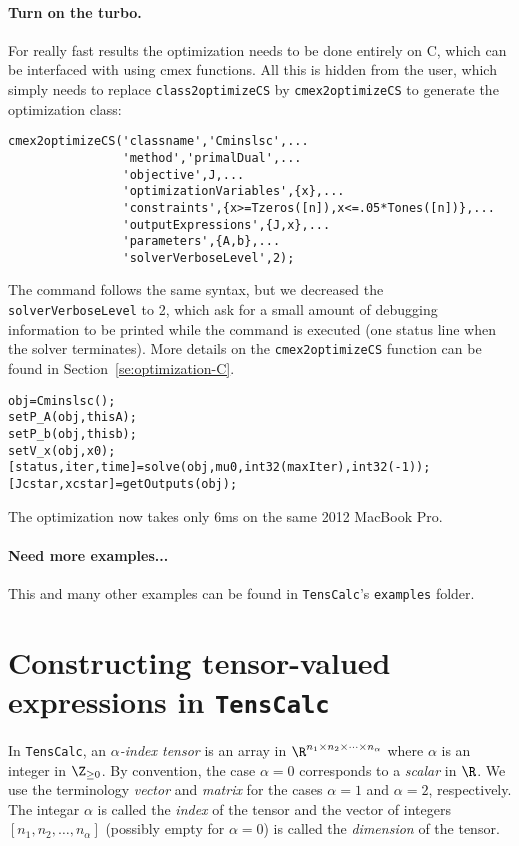 \documentclass[11pt]{article}
\newcommand{\TC}{\texttt{TensCalc}}
\theoremstyle{remark}
\begin{document}
\paragraph{Turn on the turbo.} For really fast results the
optimization needs to be done entirely on C, which can be interfaced
with \matlab{} using cmex functions. All this is hidden from the user,
which simply needs to replace \lstinline{class2optimizeCS} by
\lstinline{cmex2optimizeCS} to generate the optimization class:
\begin{lstlisting}
cmex2optimizeCS('classname','Cminslsc',...
                'method','primalDual',...
                'objective',J,...
                'optimizationVariables',{x},...
                'constraints',{x>=Tzeros([n]),x<=.05*Tones([n])},...
                'outputExpressions',{J,x},...
                'parameters',{A,b},...
                'solverVerboseLevel',2);
\end{lstlisting}
The command follows the same syntax, but we decreased the
\lstinline{solverVerboseLevel} to 2, which ask for a small amount of
debugging information to be printed while the command is executed (one
status line when the solver terminates).  More details on the
\lstinline{cmex2optimizeCS} function can be found in
Section~\ref{se:optimization-C}.

\begin{lstlisting}
obj=Cminslsc();
setP_A(obj,thisA);
setP_b(obj,thisb);
setV_x(obj,x0);
[status,iter,time]=solve(obj,mu0,int32(maxIter),int32(-1));
[Jcstar,xcstar]=getOutputs(obj);
\end{lstlisting}
The optimization now takes only 6ms on the same 2012 MacBook Pro.

\paragraph{Need more examples...} This and many other examples can be
found in \TC's \lstinline{examples} folder.

\section{Constructing tensor-valued expressions in \TC}
\label{se:expressions}

In \TC{}, an \emph{$\alpha$-index tensor} is an array in $\R^{n_1\times n_2\times\cdots\times
  n_\alpha}$ where $\alpha$ is an integer in $\Z_{\ge 0}$. By convention, the case
$\alpha=0$ corresponds to a \emph{scalar} in $\R$. We use the terminology
\emph{vector} and \emph{matrix} for the cases $\alpha=1$ and $\alpha=2$,
respectively. The integar $\alpha$ is called the \emph{index} of the tensor
and the vector of integers $[n_1,n_2,\dots,n_\alpha]$ (possibly empty for
$\alpha=0$) is called the \emph{dimension} of the tensor.
\end{document}
